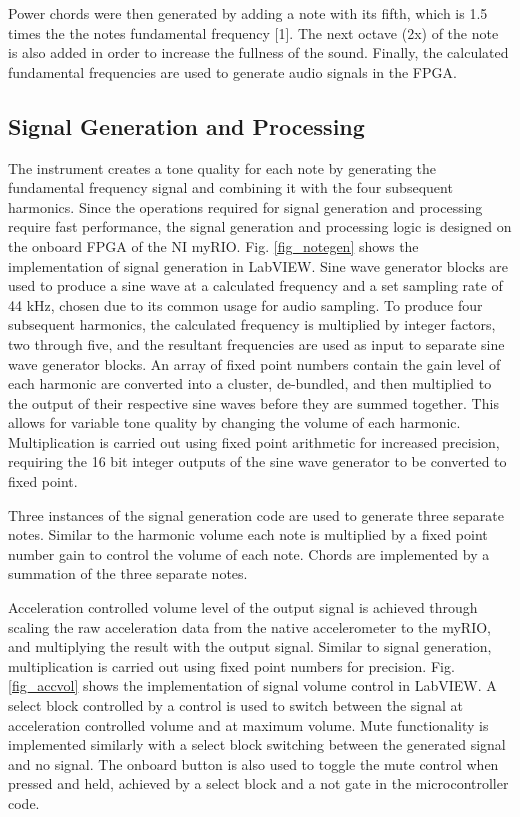 Power chords were then generated by adding a note with its fifth, which is 1.5 times the the notes fundamental frequency [1].
 The next octave (2x) of the note is also added in order to increase the fullness of the sound.
 Finally, the calculated fundamental frequencies are used to generate audio signals in the FPGA.

\subsection{Signal Generation and Processing}
The instrument creates a tone quality for each note by generating the fundamental frequency signal and combining it with the four subsequent harmonics.
 Since the operations required for signal generation and processing require fast performance, the signal generation and processing logic is designed on the onboard FPGA of the NI myRIO.
 Fig. \ref{fig_notegen} shows the implementation of signal generation in LabVIEW.
 Sine wave generator blocks are used to produce a sine wave at a calculated frequency and a set sampling rate of 44 kHz, chosen due to its common usage for audio sampling.
 To produce four subsequent harmonics, the calculated frequency is multiplied by integer factors, two through five, and the resultant frequencies are used as input to separate sine wave generator blocks.
 An array of fixed point numbers contain the gain level of each harmonic are converted into a cluster, de-bundled, and then multiplied to the output of their respective sine waves before they are summed together.
 This allows for variable tone quality by changing the volume of each harmonic.
 Multiplication is carried out using fixed point arithmetic for increased precision, requiring the 16 bit integer outputs of the sine wave generator to be converted to fixed point.

Three instances of the signal generation code are used to generate three separate notes. 
Similar to the harmonic volume each note is multiplied by a fixed point number gain to control the volume of each note. 
Chords are implemented by a summation of the three separate notes.

Acceleration controlled volume level of the output signal is achieved through scaling the raw acceleration data from the native accelerometer to the myRIO, and multiplying the result with the output signal. 
Similar to signal generation, multiplication is carried out using fixed point numbers for precision. 
 Fig. \ref{fig_accvol} shows the implementation of signal volume control in LabVIEW.
 A select block controlled by a control is used to switch between the signal at acceleration controlled volume and at maximum volume.
 Mute functionality is implemented similarly with a select block switching between the generated signal and no signal.
 The onboard button is also used to toggle the mute control when pressed and held, achieved by a select block and a not gate in the microcontroller code.


